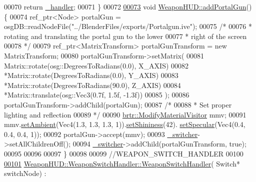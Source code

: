 \begin{DoxyCode}
00070         \textcolor{keywordflow}{return} \hyperlink{classbrtr_1_1_weapon_h_u_d_a4ebf9d9e600e3a6b9f5d8601c084ee51}{\_handler};
00071     \}
00072 
\hypertarget{_weapon_h_u_d_8cpp_source_l00073}{}\hyperlink{classbrtr_1_1_weapon_h_u_d_ab8ccf2821f698af567b7ce40eb6840d8}{00073}     \textcolor{keywordtype}{void} \hyperlink{classbrtr_1_1_weapon_h_u_d_ab8ccf2821f698af567b7ce40eb6840d8}{WeaponHUD::addPortalGun}() \{
00074         ref\_ptr<Node> portalGun = osgDB::readNodeFile(\textcolor{stringliteral}{"../BlenderFiles/exports/Portalgun.ive"});
00075     \textcolor{comment}{/*}
00076 \textcolor{comment}{     * rotating and translating the portal gun to the lower}
00077 \textcolor{comment}{     * right of the screen}
00078 \textcolor{comment}{     */}
00079         ref\_ptr<MatrixTransform> portalGunTransform = \textcolor{keyword}{new} MatrixTransform;
00080         portalGunTransform->setMatrix(
00081             Matrix::rotate(osg::DegreesToRadians(0.0), X\_AXIS)
00082             *Matrix::rotate(DegreesToRadians(0.0), Y\_AXIS)
00083             *Matrix::rotate(DegreesToRadians(90.0), Z\_AXIS)
00084             *Matrix::translate(osg::Vec3(0.7f, 1.5f, -1.3f))
00085             );
00086         portalGunTransform->addChild(portalGun);
00087         \textcolor{comment}{/*}
00088 \textcolor{comment}{     * Set proper lighting and reflection}
00089 \textcolor{comment}{     */}
00090     \hyperlink{classbrtr_1_1_modify_material_visitor}{brtr::ModifyMaterialVisitor} mmv;
00091         mmv.\hyperlink{classbrtr_1_1_modify_material_visitor_adfaa00524e765fdf3ddc5968187623cd}{setAmbient}(Vec4(1.3, 1.3, 1.3, 1)).\hyperlink{classbrtr_1_1_modify_material_visitor_a698aa0c31f8c5add503d47bc9898eec3}{setShininess}(42).
      \hyperlink{classbrtr_1_1_modify_material_visitor_a7a8a5a938799c5193645d86aa6dc6a7c}{setSpecular}(Vec4(0.4, 0.4, 0.4, 1));
00092         portalGun->accept(mmv);
00093         \hyperlink{classbrtr_1_1_weapon_h_u_d_a32d5e498c15faa87f3bcfa83ca6c5b0e}{\_switcher}->setAllChildrenOff();
00094         \hyperlink{classbrtr_1_1_weapon_h_u_d_a32d5e498c15faa87f3bcfa83ca6c5b0e}{\_switcher}->addChild(portalGunTransform, \textcolor{keyword}{true});
00095         
00096 
00097     \}
00098 
00099 \textcolor{comment}{//WEAPON\_SWITCH\_HANDLER}
00100 
\hypertarget{_weapon_h_u_d_8cpp_source_l00101}{}\hyperlink{classbrtr_1_1_weapon_h_u_d_1_1_weapon_switch_handler_a0f61e3aa44c58264e440186f1d7dbb0f}{00101}     \hyperlink{classbrtr_1_1_weapon_h_u_d_1_1_weapon_switch_handler_a0f61e3aa44c58264e440186f1d7dbb0f}{WeaponHUD::WeaponSwitchHandler::WeaponSwitchHandler}(
      Switch* switchNode) :

\end{DoxyCode}
